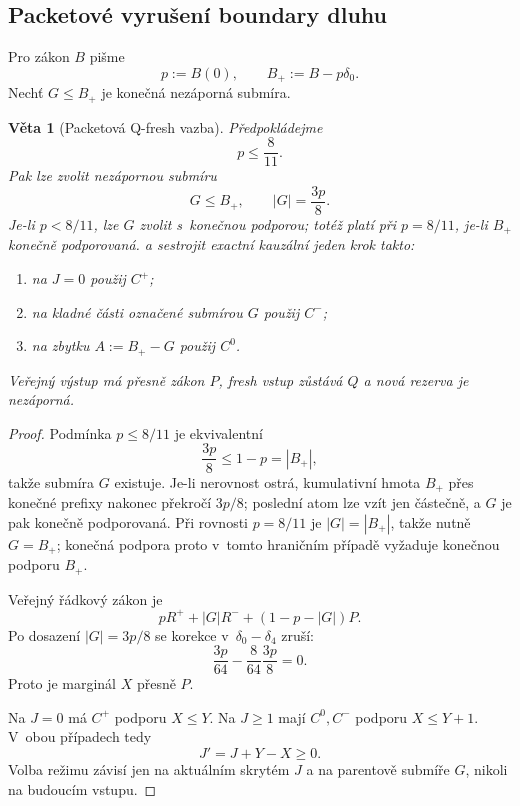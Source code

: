 \documentclass[11pt,a4paper]{article}
\newtheorem{theorem}{Věta}[section]
\theoremstyle{definition}
\theoremstyle{remark}
\begin{document}
\subsection{Packetov\'e vyru\v sen\'i boundary dluhu}

Pro z\'akon $B$ pi\v sme
\[
p:=B(0),\qquad B_+:=B-p\delta_0.
\]
Nech\v t $G\le B_+$ je kone\v cn\'a nez\'aporn\'a subm\'ira.

\begin{theorem}[Packetov\'a Q-fresh vazba]
\label{thm:packet-fresh}
P\v redpokl\'adejme
\[
p\le\frac8{11}.
\]
Pak lze zvolit nez\'apornou subm\'iru
\[
\boxed{
G\le B_+,\qquad |G|=\frac{3p}{8}.
}
\tag{P1}
\]
Je-li \(p<8/11\), lze \(G\) zvolit s~kone\v cnou podporou; tot\'e\v z
plat\'i p\v ri \(p=8/11\), je-li \(B_+\) kone\v cn\v e podporovan\'a.
a sestrojit exactn\'i kauz\'aln\'i jeden krok takto:
\begin{enumerate}[leftmargin=1.4em]
\item na $J=0$ pou\v zij $C^{+}$;
\item na kladn\'e \v c\'asti ozna\v cen\'e subm\'irou $G$ pou\v zij $C^{-}$;
\item na zbytku $A:=B_+-G$ pou\v zij $C^{0}$.
\end{enumerate}
Ve\v rejn\'y v\'ystup m\'a p\v resn\v e z\'akon $P$, fresh vstup z\r ust\'av\'a $Q$
a nov\'a rezerva je nez\'aporn\'a.
\end{theorem}

\begin{proof}
Podm\'inka $p\le8/11$ je ekvivalentn\'i
\[
\frac{3p}{8}\le1-p=|B_+|,
\]
tak\v ze subm\'ira $G$ existuje. Je-li nerovnost ostr\'a, kumulativn\'i
hmota \(B_+\) p\v res kone\v cn\'e prefixy nakonec p\v rekro\v c\'i
\(3p/8\); posledn\'i atom lze vz\'it jen \v c\'aste\v cn\v e, a \(G\)
je pak kone\v cn\v e podporovan\'a. P\v ri rovnosti \(p=8/11\) je
\(|G|=|B_+|\), tak\v ze nutn\v e \(G=B_+\); kone\v cn\'a podpora proto
v~tomto hrani\v cn\'im p\v r\'ipad\v e vy\v zaduje kone\v cnou podporu
\(B_+\).

Ve\v rejn\'y \v r\'adkov\'y z\'akon je
\[
pR^{+}+|G|R^{-}+(1-p-|G|)P.
\]
Po dosazen\'i $|G|=3p/8$ se korekce v~$\delta_0-\delta_4$ zru\v s\'i:
\[
\frac{3p}{64}-\frac{8}{64}\frac{3p}{8}=0.
\]
Proto je margin\'al $X$ p\v resn\v e $P$.

Na $J=0$ m\'a $C^{+}$ podporu $X\le Y$.
Na $J\ge1$ maj\'i $C^{0},C^{-}$ podporu $X\le Y+1$.
V~obou p\v r\'ipadech tedy
\[
J'=J+Y-X\ge0.
\]
Volba re\v zimu z\'avis\'i jen na aktu\'aln\'im skryt\'em $J$ a na parentov\v e
subm\'i\v re $G$, nikoli na budouc\'im vstupu.
\end{proof}
\end{document}
